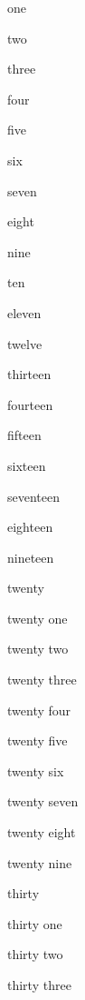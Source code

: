 \documentclass[
  a4paper,
]{article}
\begin{document}
one

{\textcolor[HTML]{E60000}{two}}

{\textcolor[HTML]{FF9900}{three}}

{\textcolor[HTML]{FFFF00}{four}}

{\textcolor[HTML]{008A00}{five}}

{\textcolor[HTML]{0066CC}{six}}

{\textcolor[HTML]{9933FF}{seven}}

{\textcolor[HTML]{FFFFFF}{eight}}

{\textcolor[HTML]{FACCCC}{nine}}

{\textcolor[HTML]{FFEBCC}{ten}}

{\textcolor[HTML]{FFFFCC}{eleven}}

{\textcolor[HTML]{CCE8CC}{twelve}}

{\textcolor[HTML]{CCE0F5}{thirteen}}

{\textcolor[HTML]{EBD6FF}{fourteen}}

{\textcolor[HTML]{BBBBBB}{fifteen}}

{\textcolor[HTML]{F06666}{sixteen}}

{\textcolor[HTML]{FFC266}{seventeen}}

{\textcolor[HTML]{FFFF66}{eighteen}}

{\textcolor[HTML]{66B966}{nineteen}}

{\textcolor[HTML]{66A3E0}{twenty}}

{\textcolor[HTML]{C285FF}{twenty one}}

{\textcolor[HTML]{888888}{twenty two}}

{\textcolor[HTML]{A10000}{twenty three}}

{\textcolor[HTML]{B26B00}{twenty four}}

{\textcolor[HTML]{B2B200}{twenty five}}

\newpage

{\textcolor[HTML]{006100}{twenty six}}

{\textcolor[HTML]{0047B2}{twenty seven}}

\newpage

{\textcolor[HTML]{6B24B2}{twenty eight}}

{\textcolor[HTML]{444444}{twenty nine}}

{\textcolor[HTML]{5C0000}{thirty}}

{\textcolor[HTML]{663D00}{thirty one}}

{\textcolor[HTML]{666600}{thirty two}}

{\textcolor[HTML]{003700}{thirty three}}
\end{document}
